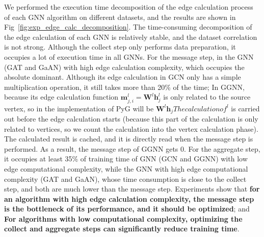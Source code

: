 We performed the execution time decomposition of the edge calculation process of each GNN algorithm on different datasets,
and the results are shown in Fig~\ref{fig:exp_edge_calc_decomposition}.
The time-consuming decomposition of the edge calculation of each GNN is relatively stable, 
and the dataset correlation is not strong. Although the collect step only performs data preparation,
it occupies a lot of execution time in all GNNs. For the message step, in the GNN (GAT and GaAN) with high edge calculation complexity, 
which occupies the absolute dominant. Although its edge calculation in GCN only has a simple multiplication operation, it still takes more than 20\% of the time; 
In GGNN, because its edge calculation function $\boldsymbol{m}_{j,i }^l=\boldsymbol{W}^l\boldsymbol{h}_{j}^l$ is only related to the source vertex, 
so in the implementation of PyG will be $\boldsymbol{W}^l\boldsymbol{h}_j The calculation of ^l$ is carried out before the edge calculation starts
(because this part of the calculation is only related to vertices, so we count the calculation into the vertex calculation phase).
The calculated result is cached, and it is directly read when the message step is performed. As a result, the message step of GGNN gets 0.
For the aggregate step, it occupies at least 35\% of training time of GNN (GCN and GGNN) with low edge computational complexity,
while the GNN with high edge computational complexity (GAT and GaAN), whose time consumption is close to the collect step,
and both are much lower than the message step. Experiments show that \textbf{for an algorithm with high edge calculation complexity,
the message step is the bottleneck of its performance, and it should be optimized}; and \textbf{For algorithms with low computational complexity,
optimizing the collect and aggregate steps can significantly reduce training time}.

